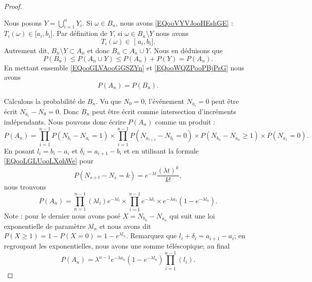 \begin{proof}
\begin{subproof}
        Nous posons \( Y=\bigcup_{i=1}^nY_i\).
        \spitem[\( P(B_n)\leq P(A_n)\)]
        Si \( \omega\in B_n\), nous avons \eqref{EQooVYVJooHEshGE} : \( T_i(\omega)\in \mathopen[ a_i , b_i \mathclose]\). Par définition de \( Y\), si \( \omega\in B_n\setminus Y\) nous avons
        \begin{equation}
    T_i(\omega)\in \mathopen] a_i , b_i \mathclose].
        \end{equation}
        Autrement dit, \( B_n\setminus Y\subset A_n\) et donc \( B_n\subset A_n\cup Y\). Nous en déduisons que
        \begin{equation}    \label{EQooWQZPooPBjPsG}
            P(B_n)\leq P(A_n\cup Y)\leq P(A_n)+P(Y)=P(A_n).
        \end{equation}
        \spitem[\( P(A_n)=P(B_n)\)]
        En mettant ensemble \eqref{EQooGLVAooGGSZYn} et \eqref{EQooWQZPooPBjPsG} nous avons
        \begin{equation}
            P(A_n)=P(B_n).
        \end{equation}
    \end{subproof}
    Calculons la probabilité de \( B_n\). Vu que \( N_0=0\), l'événement \( N_{a_i}=0\) peut être écrit \( N_{a_i}-N_0=0\). Donc \( B_n\) peut être écrit comme intersection d'incréments indépendants. Nous pouvons donc écrire \( P(A_n)\) comme un produit :
    \begin{equation}
        P(A_n)=\prod_{i=1}^{n-1}P(N_{b_i}-N_{a_i}=1)\times\prod_{i=1}^{n-1}P(N_{a_{i+1}}-N_{b_i}=0)\times P(N_{b_n}-N_{a_n}\geq 1)\times P(N_{a_1}=0).
    \end{equation}
    En posant \( l_i=b_i-a_i\) et \( \delta_i=a_{i+1}-b_i\) et en utilisant la formule \eqref{EQooLGLUooLXohWe} pour
    \begin{equation}
        P(N_{s+t}-N_s=k)= e^{-\lambda t}\frac{ (\lambda t)^k }{ k! },
    \end{equation}
    nous trouvons
    \begin{equation}
        P(A_n)=\prod_{n=1}^{n-1}(\lambda l_i) e^{-\lambda l_l}\times \prod_{i=1}^{n-1} e^{-\lambda \delta_i}\times  e^{-\lambda a_1}(1- e^{-\lambda l_n}).
    \end{equation}
    Note : pour le dernier nous avons posé \( X=N_{b_n}-N_{a_n}\) qui suit une loi exponentielle de paramètre \( \lambda l_n\) et nous avons dit $P(X\geq 1)=1-P(X=0)=1- e^{\lambda l_n}$. Remarquez que \( l_i+\delta_i=a_{i+1}-a_i\); en regroupant les exponentielles, nous avons une somme téléscopique; au final
    \begin{equation}
        P(A_n)=\lambda^{n-1} e^{-\lambda a_n}(1- e^{-\lambda l_n})\prod_{i=1}^{n-1}(l_i).
    \end{equation}
    

\end{proof}
